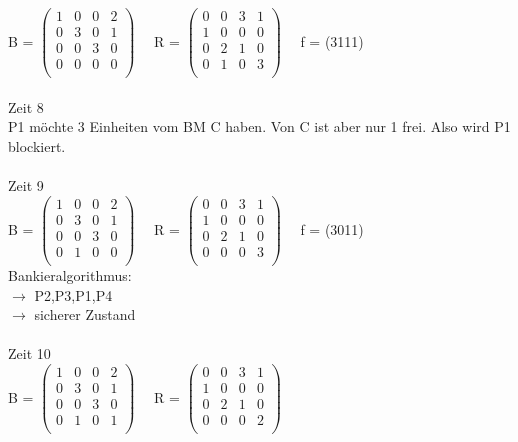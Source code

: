 \documentclass[10pt,a4paper]{scrartcl}
\begin{document}
	B =
	$\left( \begin{array}{rrrr}
	1 & 0 & 0 & 2 \\
	0 & 3 & 0 & 1 \\
	0 & 0 & 3 & 0 \\
	0 & 0 & 0 & 0 \\
	\end{array}\right) $
	\ \ R =
	$\left( \begin{array}{rrrr}
	0 & 0 & 3 & 1 \\
	1 & 0 & 0 & 0 \\
	0 & 2 & 1 & 0 \\
	0 & 1 & 0 & 3 \\
	\end{array}\right) $ 
	\ \ f = (3111)
	\\\\Zeit 8\\
	P1 möchte 3 Einheiten vom BM C haben. Von C ist aber nur 1 frei. Also wird P1 blockiert.
	\\\\Zeit 9\\
	B =
	$\left( \begin{array}{rrrr}
	1 & 0 & 0 & 2 \\
	0 & 3 & 0 & 1 \\
	0 & 0 & 3 & 0 \\
	0 & 1 & 0 & 0 \\
	\end{array}\right) $
	\ \ R =
	$\left( \begin{array}{rrrr}
	0 & 0 & 3 & 1 \\
	1 & 0 & 0 & 0 \\
	0 & 2 & 1 & 0 \\
	0 & 0 & 0 & 3 \\
	\end{array}\right) $ 
	\ \ f = (3011)\\
	Bankieralgorithmus:\\
	$\rightarrow$ P2,P3,P1,P4\\
	$\rightarrow$ sicherer Zustand
	\\\\Zeit 10\\
	B =
	$\left( \begin{array}{rrrr}
	1 & 0 & 0 & 2 \\
	0 & 3 & 0 & 1 \\
	0 & 0 & 3 & 0 \\
	0 & 1 & 0 & 1 \\
	\end{array}\right) $
	\ \ R =
	$\left( \begin{array}{rrrr}
	0 & 0 & 3 & 1 \\
	1 & 0 & 0 & 0 \\
	0 & 2 & 1 & 0 \\
	0 & 0 & 0 & 2 \\
	\end{array}\right) $ 
\end{document}
